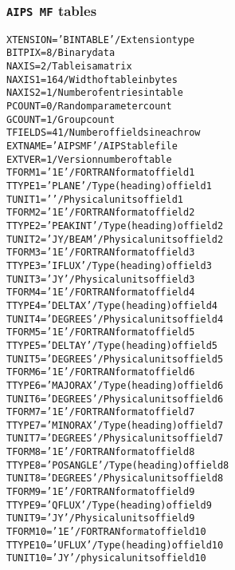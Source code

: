 \documentclass[twoside]{article}
\begin{document}
\subsubsection{{\tt AIPS MF} tables}
\label{Appe:MFtable}
\begin{alltt}
XTENSION= 'BINTABLE'           / Extension type
BITPIX  =                    8 / Binary data
NAXIS   =                    2 / Table is a matrix
NAXIS1  =                  164 / Width of table in bytes
NAXIS2  =                    1 / Number of entries in table
PCOUNT  =                    0 / Random parameter count
GCOUNT  =                    1 / Group count
TFIELDS =                   41 / Number of fields in each row
EXTNAME = 'AIPS MF '           / AIPS table file
EXTVER  =                    1 / Version number of table
TFORM1  = '1E      '           / FORTRAN format of field  1
TTYPE1  = 'PLANE           '   / Type (heading) of field  1
TUNIT1  = '        '           / Physical units of field  1
TFORM2  = '1E      '           / FORTRAN format of field  2
TTYPE2  = 'PEAK INT        '   / Type (heading) of field  2
TUNIT2  = 'JY/BEAM '           / Physical units of field  2
TFORM3  = '1E      '           / FORTRAN format of field  3
TTYPE3  = 'I FLUX          '   / Type (heading) of field  3
TUNIT3  = 'JY      '           / Physical units of field  3
TFORM4  = '1E      '           / FORTRAN format of field  4
TTYPE4  = 'DELTAX          '   / Type (heading) of field  4
TUNIT4  = 'DEGREES '           / Physical units of field  4
TFORM5  = '1E      '           / FORTRAN format of field  5
TTYPE5  = 'DELTAY          '   / Type (heading) of field  5
TUNIT5  = 'DEGREES '           / Physical units of field  5
TFORM6  = '1E      '           / FORTRAN format of field  6
TTYPE6  = 'MAJOR AX        '   / Type (heading) of field  6
TUNIT6  = 'DEGREES '           / Physical units of field  6
TFORM7  = '1E      '           / FORTRAN format of field  7
TTYPE7  = 'MINOR AX        '   / Type (heading) of field  7
TUNIT7  = 'DEGREES '           / Physical units of field  7
TFORM8  = '1E      '           / FORTRAN format of field  8
TTYPE8  = 'POSANGLE        '   / Type (heading) of field  8
TUNIT8  = 'DEGREES '           / Physical units of field  8
TFORM9  = '1E      '           / FORTRAN format of field  9
TTYPE9  = 'Q FLUX          '   / Type (heading) of field  9
TUNIT9  = 'JY      '           / Physical units of field  9
TFORM10 = '1E      '           / FORTRAN format of field 10
TTYPE10 = 'U FLUX          '   / Type (heading) of field 10
TUNIT10 = 'JY      '           / physical units of field 10

\end{alltt}
\end{document}
